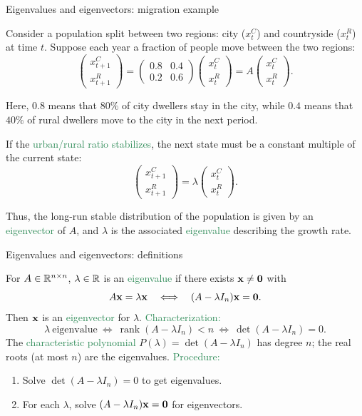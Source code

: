 \documentclass[11pt,aspectratio=169]{beamer}
\DeclareMathOperator{\rank}{rank}
\begin{document}
\begin{frame}{Eigenvalues and eigenvectors: migration example}

Consider a population split between two regions: city ($x_t^C$) and countryside ($x_t^R$) at time $t$.
Suppose each year a fraction of people move between the two regions:
\[
\begin{pmatrix}x^C_{t+1}\\ x^R_{t+1}\end{pmatrix}
=
\begin{pmatrix}0.8 & 0.4 \\ 0.2 & 0.6\end{pmatrix}
\begin{pmatrix}x^C_t\\ x^R_t\end{pmatrix}
= A\begin{pmatrix}x^C_t\\ x^R_t\end{pmatrix}.
\]

\medskip
Here, $0.8$ means that $80\%$ of city dwellers stay in the city, while $0.4$
means that $40\%$ of rural dwellers move to the city in the next period.

\medskip
If the \textcolor{SeaGreen}{urban/rural ratio stabilizes}, the next state must be a constant multiple of the current state:
\[
\begin{pmatrix}x^C_{t+1}\\ x^R_{t+1}\end{pmatrix}
=\lambda \begin{pmatrix}x^C_t\\ x^R_t\end{pmatrix}.
\]

\medskip
Thus, the long-run stable distribution of the population is given by an
\textcolor{SeaGreen}{eigenvector} of $A$, and $\lambda$ is the associated
\textcolor{SeaGreen}{eigenvalue} describing the growth rate.

\end{frame}
\begin{frame}{Eigenvalues and eigenvectors: definitions}
 
For $A\in\mathbb R^{n\times n}$, $\lambda\in\mathbb R$ is an \textcolor{SeaGreen}{eigenvalue} if there exists ${\bf x}\ne{\bf 0}$ with
\[
A{\bf x}=\lambda{\bf x}\quad\Longleftrightarrow\quad (A-\lambda   I_n){\bf x}={\bf 0}.
\]
Then ${\bf x}$ is an \textcolor{SeaGreen}{eigenvector} for $\lambda$.
\vskip 6pt
\textcolor{SeaGreen}{Characterization:}
\[
\lambda\ \text{eigenvalue}\ \Longleftrightarrow\ \rank(A-\lambda  I_n)<n\ \Longleftrightarrow\ \det(A-\lambda  I_n)=0.
\]
The \textcolor{SeaGreen}{characteristic polynomial} $P(\lambda)=\det(A-\lambda  I_n)$ has degree $n$; the real roots (at most $n$) are the eigenvalues.
\vskip 6pt
\textcolor{SeaGreen}{Procedure:}
\begin{enumerate}
\item Solve $\det(A-\lambda  I_n)=0$ to get eigenvalues.
\item For each $\lambda$, solve $(A-\lambda  I_n){\bf x}={\bf 0}$ for eigenvectors.
\end{enumerate}
 
\end{frame}
\end{document}
